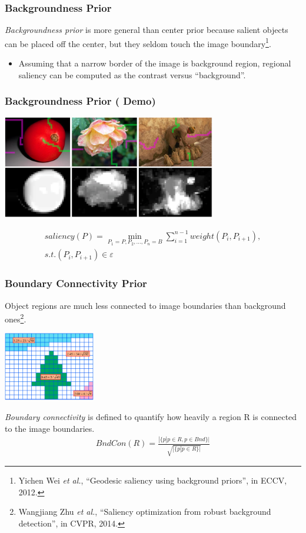 \documentclass[notheorems,serif,table,compress]{beamer}  %
\begin{document}
\begin{frame}
\frametitle{ Backgroundness Prior}
{\color{blue}\emph{Backgroundness prior}} is more general than center prior because salient objects can be placed off the center, but they seldom touch the image boundary\footnote{Yichen Wei \textit{et al.}, ``Geodesic saliency using background priors'', in ECCV, 2012.}.
\begin{itemize}
\item Assuming that a narrow border of the image is background region, regional saliency can be computed as the contrast versus ``background''.
\end{itemize}
\vspace{0.3in}
\end{frame}

\begin{frame}
\frametitle{ Backgroundness Prior (\color{yellow} \textbf{Demo})}
\centering\includegraphics[width=0.7\textwidth]{GS.png}

\begin{align}
saliency(P) = \min_{P_1=P, P_2, \ldots, P_n=B}\sum_{i=1}^{n-1}weight(P_i, P_{i+1}), \\
s.t.(P_i, P_{i+1})\in \varepsilon \nonumber
\end{align}
\end{frame}

\begin{frame}
\frametitle{ Boundary Connectivity Prior}
{\color{blue}Object regions are much less connected to image boundaries than background ones}\footnote{Wangjiang Zhu \textit{et al.}, ``Saliency optimization from robust background detection'', in CVPR, 2014.}{\color{blue}.}

\centering\includegraphics[width=4cm]{wCtr.png}

\emph{Boundary connectivity} is defined to quantify how heavily a region R is connected to the image boundaries.
\begin{align}
BndCon(R) = \frac{|\{p|p\in R, p\in Bnd\}|}{\sqrt{|\{p|p\in R\}|}}
\end{align}
\end{frame}
\end{document}
